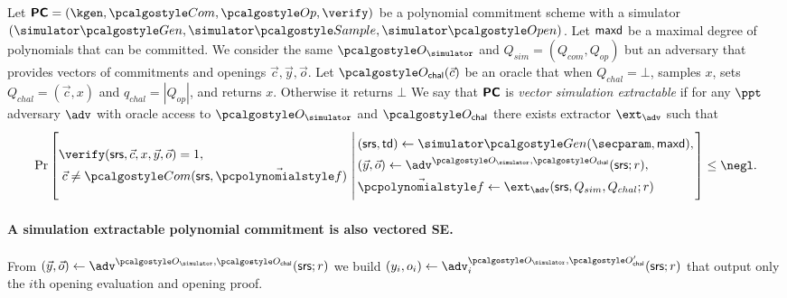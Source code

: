 \documentclass[runningheads,11pt]{llncs}
\let\spvec\vec \let\vec\accentvec
\let\vec\spvec
\begin{document}
\begin{definition}
  \label{def:sepcom}
  Let $\PCOM = (\kgen, \com, \open, \verify)$ be a polynomial commitment
  scheme with a simulator $(\simgen, \simsample, \simopen)$. Let $\mathsf{maxd}$ be a maximal degree of polynomials that can be
  committed.
  We consider the same $\oracles$ and $Q_{sim}= (Q_{com},Q_{op})$ but an adversary that provides vectors of commitments and openings $\vec{c}, \vec{y}, \vec{o}$.
   Let $\oraclec(\vec{c})$ be an oracle that when $Q_{chal}= \bot$, samples $x$, sets $Q_{chal}=(\vec{c},x)$ and $q_{{chal}}= |Q_{{op}}|$, and returns $x$. Otherwise it returns $\bot$
  We say that $\bm{\mathsf{PC}}$ is \emph{vector simulation extractable} if for any $\ppt$
  adversary $\adv$ with oracle access to $\oracles$ and $\oraclec$ there exists extractor
  $\ext_{\adv}$ such that
\[
  \Pr \left[
    \begin{aligned}
      & \verify(\srs, \vec{c}, x, \vec{y}, \vec{o}) = 1, \\
      & \;\vec{c} \neq \com(\srs, \vec{\p{f}})\\
    \end{aligned}
    \,\left|\,
      \vphantom{
        \begin{aligned}
          & \\
          & \\
          & \\
          &
        \end{aligned}
        }
    \begin{aligned}
      & (\srs, \td) \gets \simgen(\secparam, \maxdeg),\\
      & (\vec{y}, \vec{o}) \gets \adv^{\oracles,\oraclec}(\srs; r), \\
      & \vec{\p{f}} \gets \ext_\adv(\srs, Q_{sim}, Q_{chal}; r)
    \end{aligned}
  \right.\right]
  \leq \negl.
\]
\end{definition}

\paragraph{A simulation extractable polynomial commitment is also vectored SE.}
From $(\vec{y}, \vec{o}) \gets \adv^{\oracles,\oraclec}(\srs; r)$ we build $(y_{i}, o_{i}) \gets \adv_{i}^{\oracles,\oraclec'}(\srs; r)$ that output only the $i$th opening evaluation and opening proof.
\end{document}
